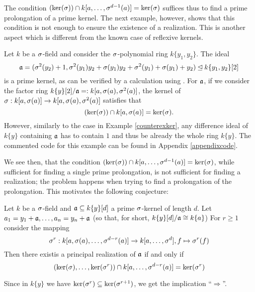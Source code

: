 The condition $(\operatorname{ker}(\sigma)) \cap k[a,\ldots,\sigma^{d-1}(a)] = \operatorname{ker}(\sigma)$ suffices thus to find a prime prolongation of a prime kernel. 
The next example, however, shows that this condition is not enough to ensure the existence of a realization. This is another aspect which is different from the known case of reflexive kernels.


\begin{ex}\label{secondexamplem2}
Let $k$ be a $\sigma$-field and consider the $\sigma$-polynomial ring $k\{y_1,y_2\}$. 
The ideal $$\mathfrak{a} = (\sigma^2(y_2)+1,\sigma^2(y_1)y_2 + \sigma(y_1)y_2 + \sigma^2(y_1) + \sigma(y_1) + y_2) \unlhd k\{y_1,y_2\}[2]$$ is a prime kernel,
as can be verified by a calculation using \cite{M2}. For $\mathfrak{a}$, if we consider the factor ring 
$k\{y\}[2]/\mathfrak{a} =: k[a,\sigma(a),\sigma^2(a)]$, the kernel of $\sigma: k[a,\sigma(a)] \rightarrow k[a,\sigma(a),\sigma^2(a)]$
satisfies that $$(\operatorname{ker}(\sigma)) \cap k[a,\sigma(a)] = \operatorname{ker}(\sigma).$$ However, similarly to the case in Example \ref{counterexker}, any difference ideal of $k\{y\}$ containing 
$\mathfrak{a}$ has to contain $1$ and thus be already the whole ring $k\{y\}$. The commented code for this example can be found in Appendix \ref{appendixcode}.
\end{ex}

We see then, that the condition $(\operatorname{ker}(\sigma)) \cap k[a,\ldots,\sigma^{d-1}(a)] = \operatorname{ker}(\sigma)$, while sufficient for finding a single prime prolongation,
is not sufficient for finding a realization; the problem happens when trying to find a prolongation of the prolongation. This motivates the following conjecture:

\begin{conj}
Let $k$ be a $\sigma$-field and $\mathfrak{a} \subseteq k\{y\}[d]$ a prime $\sigma$-kernel of length $d$.
Let $a_1 = y_1 + \mathfrak{a} ,\ldots,a_n = y_n + \mathfrak{a}$ (so that, for short, $k\{y\}[d]/\mathfrak{a} \cong k\{a\}$)
For $r \geq 1$ consider the mapping 
\[ \sigma^r : k[a,\sigma(a),\ldots,\sigma^{d-r}(a)] \rightarrow k[a,\ldots,\sigma^{d}], f \mapsto \sigma^r(f) \]
Then there existis a principal realization of $\mathfrak{a}$ if and only if 
\begin{equation*} (\operatorname{ker}(\sigma),\ldots,\operatorname{ker}(\sigma^r)) \cap k[a,\ldots,\sigma^{d-r}(a)] = \operatorname{ker}(\sigma^r) \end{equation*}
\end{conj}

Since in $k\{y\}$ we have $\operatorname{ker}(\sigma^r) \subseteq \operatorname{ker}(\sigma^{r+1})$, we get the implication ``$\Rightarrow$''. 





